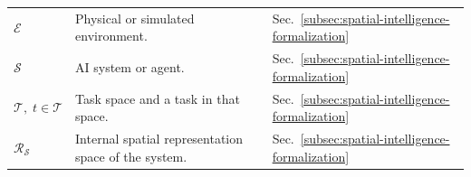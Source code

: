 \begin{longtable}{lll}
$\mathcal{E}$ & Physical or simulated environment. & Sec.~\ref{subsec:spatial-intelligence-formalization} \\
$\mathcal{S}$ & AI system or agent. & Sec.~\ref{subsec:spatial-intelligence-formalization} \\
$\mathcal{T},\;t\in\mathcal{T}$ & Task space and a task in that space. & Sec.~\ref{subsec:spatial-intelligence-formalization} \\
$\mathcal{R}_{\mathcal{S}}$ & Internal spatial representation space of the system. & Sec.~\ref{subsec:spatial-intelligence-formalization} \\

\end{longtable}

